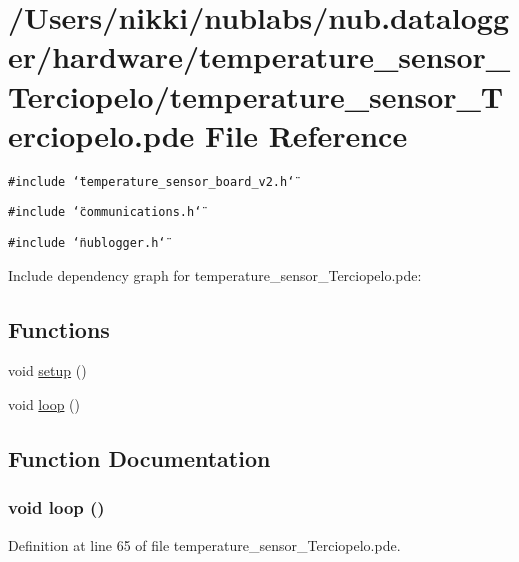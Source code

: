 \hypertarget{temperature__sensor___terciopelo_8pde}{
\section{/Users/nikki/nublabs/nub.datalogger/hardware/temperature\_\-sensor\_\-Terciopelo/temperature\_\-sensor\_\-Terciopelo.pde File Reference}
\label{temperature__sensor___terciopelo_8pde}
}
{\tt \#include \char`\"{}temperature\_\-sensor\_\-board\_\-v2.h\char`\"{}}\par
{\tt \#include \char`\"{}communications.h\char`\"{}}\par
{\tt \#include \char`\"{}nublogger.h\char`\"{}}\par


Include dependency graph for temperature\_\-sensor\_\-Terciopelo.pde:\subsection*{Functions}
\begin{CompactItemize}
\item 
void \hyperlink{temperature__sensor___terciopelo_8pde_4fc01d736fe50cf5b977f755b675f11d}{setup} ()
\item 
void \hyperlink{temperature__sensor___terciopelo_8pde_fe461d27b9c48d5921c00d521181f12f}{loop} ()
\end{CompactItemize}


\subsection{Function Documentation}
\hypertarget{temperature__sensor___terciopelo_8pde_fe461d27b9c48d5921c00d521181f12f}{
\subsubsection[{loop}]{\setlength{\rightskip}{0pt plus 5cm}void loop ()}}
\label{temperature__sensor___terciopelo_8pde_fe461d27b9c48d5921c00d521181f12f}




Definition at line 65 of file temperature\_\-sensor\_\-Terciopelo.pde.

